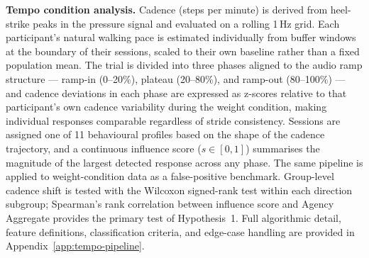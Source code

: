 
\textbf{Tempo condition analysis.}
Cadence (steps per minute) is derived from heel-strike peaks in the pressure
signal and evaluated on a rolling 1\,Hz grid.
Each participant's natural walking pace is estimated individually from buffer
windows at the boundary of their sessions, scaled to their own baseline rather
than a fixed population mean.
The trial is divided into three phases aligned to the audio ramp structure ---
ramp-in (0--20\%), plateau (20--80\%), and ramp-out (80--100\%) --- and cadence
deviations in each phase are expressed as z-scores relative to that participant's
own cadence variability during the weight condition, making individual responses
comparable regardless of stride consistency.
Sessions are assigned one of 11 behavioural profiles based on the shape of the
cadence trajectory, and a continuous influence score ($s \in [0,1]$) summarises
the magnitude of the largest detected response across any phase.
The same pipeline is applied to weight-condition data as a false-positive
benchmark.
Group-level cadence shift is tested with the Wilcoxon signed-rank test within
each direction subgroup; Spearman's rank correlation between influence score and
Agency Aggregate provides the primary test of Hypothesis~1.
Full algorithmic detail, feature definitions, classification criteria, and
edge-case handling are provided in Appendix~\ref{app:tempo-pipeline}.
